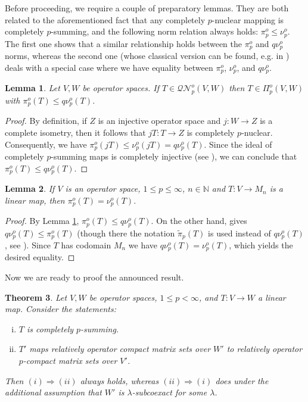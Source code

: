 \documentclass[11pt]{amsart}
\newcommand{\N}{{\mathbb{N}}}
\newtheorem{theorem}{Theorem}[section]
\newtheorem{lemma}[theorem]{Lemma}
\numberwithin{equation}{section}
\begin{document}
Before proceeding, we require a couple of preparatory lemmas.
They are both related to the aforementioned fact that any completely $p$-nuclear mapping is completely $p$-summing, and the following norm relation always holds: $\pi_p^o \le \nu_p^o$.
The first one shows that a similar relationship holds between the $\pi_p^o$ and $q\nu_p^o$ norms, whereas the second one (whose classical version can be found, e.g. in \cite[Cor. 9.5]{Tomczak-Jaegermann}) deals with a special case where we have equality between $\pi_p^o$, $\nu_p^o$, and $q\nu_p^o$.

\begin{lemma}\label{lemma:cuasi-p-nuclear es completely p-summing}
Let $V,W$ be operator spaces. If $T \in \mathcal{QN}^o_p(V,W)$ then $T\in \Pi_p^{o}(V,W)$ with $\pi_p^o(T) \le q\nu_p^o(T)$.
\end{lemma}


\begin{proof}
By definition, if $Z$ is an injective operator space and $j: W \to Z$ is a complete isometry, then it follows that $jT: T \to Z$ is completely $p$-nuclear. Consequently, we have $\pi_p^o(jT) \le \nu_p^o(jT) = q\nu_p^o(T)$.
Since the ideal of completely $p$-summing maps is completely injective (see \cite[Comment after Def. 7.5]{ChaDiGa-tensor-norms}), we can conclude that $\pi_p^o(T) \le q\nu_p^o(T)$.
\end{proof}


\begin{lemma}\label{lemma-p-summing-coincides-with-p-nuclear}
If $V$ is an operator space, $1\le p \le \infty$, $n\in\N$ and $T : V \to M_n$ is a linear map, then $\pi_p^o(T) = \nu_p^o(T)$.  
\end{lemma}

\begin{proof}
By Lemma \ref{lemma:cuasi-p-nuclear es completely p-summing}, $\pi_p^o(T) \le q\nu_p^o(T)$.
On the other hand, \cite[Prop. 3.1.3.12]{Junge-Habilitationschrift} gives $ q\nu_p^o(T) \le \pi_p^o(T)$ (though there the notation $\tilde\pi_p(T)$ is used instead of $q\nu_p^o(T)$, see \cite[Def. 3.1.3.5]{Junge-Habilitationschrift}).
Since $T$ has codomain $M_n$ we have $q\nu_p^o(T) = \nu_p^o(T)$, which yields the desired equality. 
\end{proof}


Now we are ready to proof the announced result.


\begin{theorem}\label{thm-adjoint-of-p-summing}
Let $V,W$ be operator spaces, $1\le p < \infty$, and $T : V \to W$ a linear map.
Consider the statements:
\begin{enumerate}[(i)]
    \item $T$ is completely $p$-summing.
    \item $T'$ maps relatively operator compact matrix sets over $W'$ to relatively operator $p$-compact matrix sets over $V'$. 
\end{enumerate}
Then $(i) \Rightarrow (ii)$ always holds, whereas $(ii) \Rightarrow (i)$ does under the additional assumption that $W'$ is $\lambda$-subcoexact for some $\lambda$.
\end{theorem}
\end{document}
